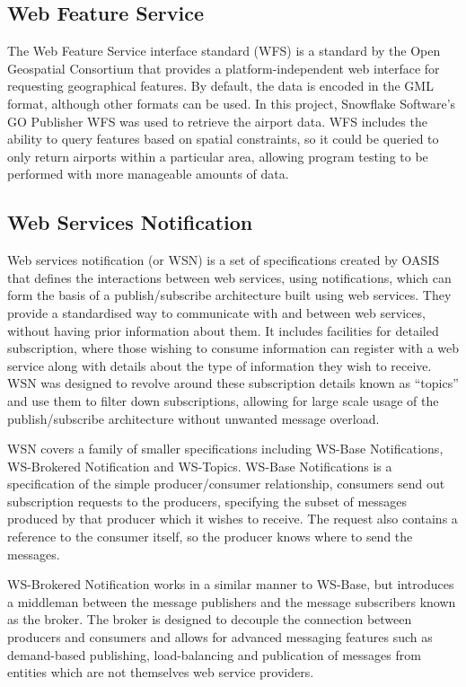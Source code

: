 \documentclass[a4paper, 12pt, twoside]{article}
\begin{document}
\subsection{Web Feature Service}
\label{sec:bg_wfs}

The Web Feature Service interface standard (WFS) is a standard by the Open Geospatial Consortium that provides a platform-independent web interface for requesting geographical features. By default, the data is encoded in the GML format, although other formats can be used. In this project, Snowflake Software's GO Publisher WFS was used to retrieve the airport data. WFS includes the ability to query features based on spatial constraints, so it could be queried to only return airports within a particular area, allowing program testing to be performed with more manageable amounts of data.

\subsection{Web Services Notification}
\label{sec:bg_wsn}

Web services notification (or WSN) is a set of specifications created by OASIS\cite{oasisWSN} that defines the interactions between web services, using notifications, which can form the basis of a publish/subscribe architecture built using web services. They provide a standardised way to communicate with and between web services, without having prior information about them. It includes facilities for detailed subscription, where those wishing to consume information can register with a web service along with details about the type of information they wish to receive. WSN was designed to revolve around these subscription details known as ``topics'' and use them to filter down subscriptions, allowing for large scale usage of the publish/subscribe architecture without unwanted message overload.

WSN covers a family of smaller specifications including WS-Base Notifications, WS-Brokered Notification and WS-Topics. WS-Base Notifications is a specification of the simple producer/consumer relationship, consumers send out subscription requests to the producers, specifying the subset of messages produced by that producer which it wishes to receive. The request also contains a reference to the consumer itself, so the producer knows where to send the messages.

WS-Brokered Notification works in a similar manner to WS-Base, but introduces a middleman between the message publishers and the message subscribers known as the broker. The broker is designed to decouple the connection between producers and consumers and allows for advanced messaging features such as demand-based publishing, load-balancing and publication of messages from entities which are not themselves web service providers.
\end{document}
